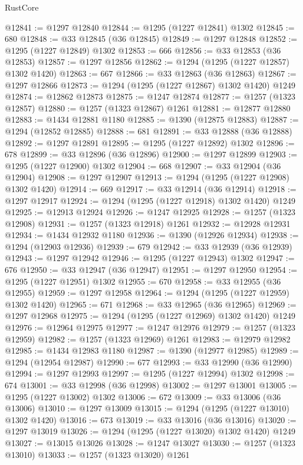 \begin{lexlean}{RustCore}
\begin{coremodule}
@12841 := @1297 @12840
@12844 := @1295 (@1227 @12841) @1302
@12845 := 680
@12848 := @33 @12845 (@36 @12845)
@12849 := @1297 @12848
@12852 := @1295 (@1227 @12849) @1302
@12853 := 666
@12856 := @33 @12853 (@36 @12853)
@12857 := @1297 @12856
@12862 := @1294 (@1295 (@1227 @12857) @1302 @1420)
@12863 := 667
@12866 := @33 @12863 (@36 @12863)
@12867 := @1297 @12866
@12873 := @1294 (@1295 (@1227 @12867) @1302 @1420) @1249
@12874 := @12862 @12873
@12875 := @1247 @12874
@12877 := @1257 (@1323 @12857)
@12880 := @1257 (@1323 @12867) @1261
@12881 := @12877 @12880
@12883 := @1434 @12881 @1180
@12885 := @1390 (@12875 @12883)
@12887 := @1294 (@12852 @12885)
@12888 := 681
@12891 := @33 @12888 (@36 @12888)
@12892 := @1297 @12891
@12895 := @1295 (@1227 @12892) @1302
@12896 := 678
@12899 := @33 @12896 (@36 @12896)
@12900 := @1297 @12899
@12903 := @1295 (@1227 @12900) @1302
@12904 := 668
@12907 := @33 @12904 (@36 @12904)
@12908 := @1297 @12907
@12913 := @1294 (@1295 (@1227 @12908) @1302 @1420)
@12914 := 669
@12917 := @33 @12914 (@36 @12914)
@12918 := @1297 @12917
@12924 := @1294 (@1295 (@1227 @12918) @1302 @1420) @1249
@12925 := @12913 @12924
@12926 := @1247 @12925
@12928 := @1257 (@1323 @12908)
@12931 := @1257 (@1323 @12918) @1261
@12932 := @12928 @12931
@12934 := @1434 @12932 @1180
@12936 := @1390 (@12926 @12934)
@12938 := @1294 (@12903 @12936)
@12939 := 679
@12942 := @33 @12939 (@36 @12939)
@12943 := @1297 @12942
@12946 := @1295 (@1227 @12943) @1302
@12947 := 676
@12950 := @33 @12947 (@36 @12947)
@12951 := @1297 @12950
@12954 := @1295 (@1227 @12951) @1302
@12955 := 670
@12958 := @33 @12955 (@36 @12955)
@12959 := @1297 @12958
@12964 := @1294 (@1295 (@1227 @12959) @1302 @1420)
@12965 := 671
@12968 := @33 @12965 (@36 @12965)
@12969 := @1297 @12968
@12975 := @1294 (@1295 (@1227 @12969) @1302 @1420) @1249
@12976 := @12964 @12975
@12977 := @1247 @12976
@12979 := @1257 (@1323 @12959)
@12982 := @1257 (@1323 @12969) @1261
@12983 := @12979 @12982
@12985 := @1434 @12983 @1180
@12987 := @1390 (@12977 @12985)
@12989 := @1294 (@12954 @12987)
@12990 := 677
@12993 := @33 @12990 (@36 @12990)
@12994 := @1297 @12993
@12997 := @1295 (@1227 @12994) @1302
@12998 := 674
@13001 := @33 @12998 (@36 @12998)
@13002 := @1297 @13001
@13005 := @1295 (@1227 @13002) @1302
@13006 := 672
@13009 := @33 @13006 (@36 @13006)
@13010 := @1297 @13009
@13015 := @1294 (@1295 (@1227 @13010) @1302 @1420)
@13016 := 673
@13019 := @33 @13016 (@36 @13016)
@13020 := @1297 @13019
@13026 := @1294 (@1295 (@1227 @13020) @1302 @1420) @1249
@13027 := @13015 @13026
@13028 := @1247 @13027
@13030 := @1257 (@1323 @13010)
@13033 := @1257 (@1323 @13020) @1261

\end{coremodule}
\end{lexlean}

